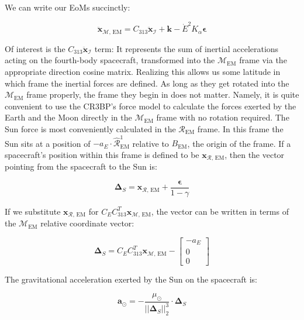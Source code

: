 \documentclass[]{article}
\newcommand{\norm}[1]{\left| \left| #1 \right| \right|_{2}}
\begin{document}
	We can write our EoMs succinctly:
	
	\begin{equation}
		\ddot{\mathbf{x}}_{\mathcal{M}\text{, EM}} = C_\text{313} \ddot{\mathbf{x}}_\mathcal{I} + \mathbf{k} - \dot{E}^2 K_\alpha \boldsymbol{\epsilon}
	\end{equation}
	
	Of interest is the $C_\text{313} \ddot{\mathbf{x}}_\mathcal{I}$ term:  It represents the sum of inertial accelerations acting on the fourth-body spacecraft, transformed into the $\mathcal{M}_\text{EM}$ frame via the appropriate direction cosine matrix. Realizing this allows us some latitude in which frame the inertial forces are defined.  As long as they get rotated into the $\mathcal{M}_\text{EM}$ frame properly, the frame they begin in does not matter.  Namely, it is quite convenient to use the CR3BP's force model to calculate the forces exerted by the Earth and the Moon directly in the $\mathcal{M}_\text{EM}$ frame with no rotation required.  The Sun force is most conveniently calculated in the $\mathcal{R}_\text{EM}$ frame.  In this frame the Sun sits at a position of $-a_E \cdot \hat{\mathcal{R}}_\text{EM}^1$ relative to $B_\text{EM}$, the origin of the frame.  If a spacecraft's position within this frame is defined to be $\mathbf{x}_{\mathcal{R}\text{, EM}}$, then the vector pointing from the spacecraft to the Sun is:
	
	\begin{equation}
		\boldsymbol{\Delta}_S =\mathbf{x}_{\mathcal{R}\text{, EM}} + \frac{\boldsymbol{\epsilon}}{1 - \gamma}
	\end{equation}
	
	If we substitute $\mathbf{x}_{\mathcal{R}\text{, EM}}$ for $C_E C^T_\text{313} \mathbf{x}_{\mathcal{M}\text{, EM}}$, the vector can be written in terms of the $\mathcal{M}_\text{EM}$ relative coordinate vector:
	
	
	\begin{equation}
		\boldsymbol{\Delta}_S = C_E C^T_\text{313} \mathbf{x}_{\mathcal{M}\text{, EM}} - \begin{bmatrix}
			-a_E \\ 0 \\ 0
		\end{bmatrix}
	\end{equation}
	
	The gravitational acceleration exerted by the Sun on the spacecraft is:
	
	\begin{equation}
		\mathbf{a}_\odot = -\frac{\mu_\odot}{\norm{\boldsymbol{\Delta}_S}^3} \cdot \boldsymbol{\Delta}_S
	\end{equation}
	
\end{document}
